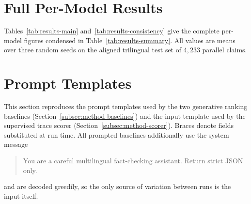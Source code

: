 
\clearpage
\section{Full Per-Model Results}
\label{app:results-full}

Tables~\ref{tab:results-main} and~\ref{tab:results-consistency} give the complete per-model figures
condensed in Table~\ref{tab:results-summary}. All values are means over three random seeds on the
aligned trilingual test set of $4{,}233$ parallel claims.





\clearpage
\section{Prompt Templates}
\label{app:prompts}

This section reproduces the prompt templates used by the two generative ranking baselines
(Section~\ref{subsec:method-baselines}) and the input template used by the supervised trace scorer
(Section~\ref{subsec:method-scorer}). Braces denote fields substituted at run time. All prompted
baselines additionally use the system message

\begin{quote}\ttfamily\small
You are a careful multilingual fact-checking assistant. Return strict JSON only.
\end{quote}

\noindent
and are decoded greedily, so the only source of variation between runs is the input itself.

